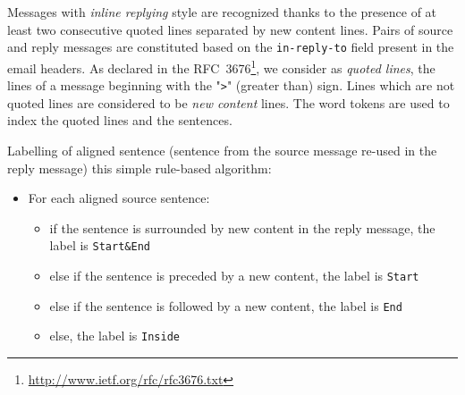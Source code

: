 %
Messages with \textit{inline replying} style are recognized thanks to the presence of at least two consecutive quoted lines separated by new content lines. 
Pairs of source and reply messages are constituted based on the \texttt{\footnotesize in-reply-to} field present in the email headers.
 As declared in the RFC~3676\footnote{\url{http://www.ietf.org/rfc/rfc3676.txt}}, we consider as \textit{quoted lines}, the lines of a message beginning with %
 the "\texttt{>}" (greater than) sign.
Lines which are not quoted lines are considered to be \textit{new content} lines.
The word tokens are used to index the quoted lines and the sentences. 


Labelling of aligned sentence (sentence from the source message re-used in the reply message) this simple rule-based algorithm:

\begin{itemize}
\item[] For each aligned source sentence: \vspace{-0.2cm}
\begin{itemize}
\item[] if the sentence is surrounded by new content in the reply message, the label is \texttt{Start\&End}
\item[] else if the sentence is preceded by a new content, the label is \texttt{Start}
\item[] \indent else if the sentence is followed by a new content, the label is \texttt{End}
\item[] else, the label is \texttt{Inside}
\end{itemize}
\end{itemize}

